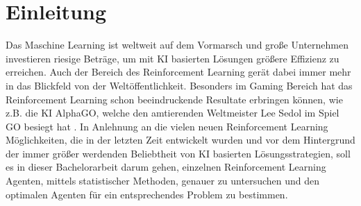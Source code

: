 \chapter{Einleitung}\label{sec:beispiel}
Das Maschine Learning ist weltweit auf dem Vormarsch und große Unternehmen investieren riesige Beträge, um mit KI basierten Lösungen größere Effizienz zu erreichen. Auch der Bereich des Reinforcement Learning gerät dabei immer mehr in das Blickfeld von der Weltöffentlichkeit. Besonders im Gaming Bereich hat das Reinforcement Learning schon beeindruckende Resultate erbringen können, wie z.B. die KI AlphaGO, welche den amtierenden Weltmeister Lee Sedol im Spiel GO besiegt hat \cite{UAV}. In Anlehnung an die vielen neuen Reinforcement Learning Möglichkeiten, die in der letzten Zeit entwickelt wurden und vor dem Hintergrund der immer größer werdenden Beliebtheit von KI basierten Lösungsstrategien, soll es in dieser Bachelorarbeit darum gehen, einzelnen Reinforcement Learning Agenten, mittels statistischer Methoden, genauer zu untersuchen und den optimalen Agenten für ein entsprechendes Problem zu bestimmen.

